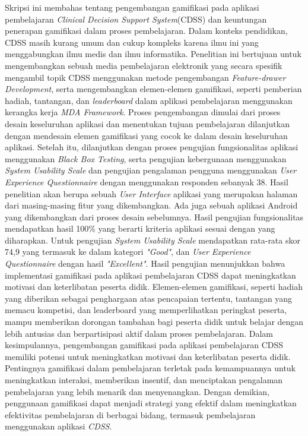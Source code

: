 Skripsi ini membahas tentang pengembangan gamifikasi pada aplikasi pembelajaran \textit{Clinical Decision Support System}(CDSS) dan keuntungan penerapan gamifikasi dalam proses pembelajaran. 
Dalam konteks pendidikan, CDSS masih kurang umum dan cukup kompleks karena ilmu ini yang menggabungkan ilmu medis dan ilmu informatika.
Penelitian ini bertujuan untuk mengembangkan sebuah media pembelajaran elektronik yang secara spesifik mengambil topik CDSS menggunakan metode pengembangan \textit{Feature-drawer Development},
serta mengembangkan elemen-elemen gamifikasi, seperti pemberian hadiah, tantangan, dan \textit{leaderboard} dalam aplikasi pembelajaran menggunakan kerangka kerja \textit{MDA Framework}. 
Proses pengembangan dimulai dari proses desain keseluruhan aplikasi dan menentukan tujuan pembelajaran dilanjutkan dengan mendesain elemen gamifikasi yang cocok ke dalam desain keseluruhan aplikasi.
Setelah itu, dilanjutkan dengan proses pengujian fungsionalitas aplikasi menggunakan \textit{Black Box Testing}, serta pengujian kebergunaan menggunakan \textit{System Usability Scale} dan pengujian pengalaman pengguna menggunakan \textit{User Experience Questionnaire} dengan menggunakan responden sebanyak 38.
Hasil penelitian akan berupa sebuah \textit{User Interface} aplikasi yang merupakan halaman dari masing-masing fitur yang dikembangkan. Ada juga sebuah aplikasi Android yang dikembangkan dari proses desain sebelumnya.
Hasil pengujian fungsionalitas mendapatkan hasil 100\% yang berarti kriteria aplikasi sesuai dengan yang diharapkan. 
Untuk pengujian \textit{System Usability Scale} mendapatkan rata-rata skor 74,9 yang termasuk ke dalam kategori \textit{"Good"}, dan \textit{User Experience Questionnaire} dengan hasil \textit{"Excellent"}.
Hasil pengujian menunjukkan bahwa implementasi gamifikasi pada aplikasi pembelajaran CDSS dapat meningkatkan motivasi dan keterlibatan peserta didik. Elemen-elemen gamifikasi, seperti hadiah yang diberikan sebagai penghargaan atas pencapaian tertentu, tantangan yang memacu kompetisi, dan leaderboard yang memperlihatkan peringkat peserta, mampu memberikan dorongan tambahan bagi peserta didik untuk belajar dengan lebih antusias dan berpartisipasi aktif dalam proses pembelajaran.
Dalam kesimpulannya, pengembangan gamifikasi pada aplikasi pembelajaran CDSS memiliki potensi untuk meningkatkan motivasi dan keterlibatan peserta didik. Pentingnya gamifikasi dalam pembelajaran terletak pada kemampuannya untuk meningkatkan interaksi, memberikan insentif, dan menciptakan pengalaman pembelajaran yang lebih menarik dan menyenangkan. Dengan demikian, penggunaan gamifikasi dapat menjadi strategi yang efektif dalam meningkatkan efektivitas pembelajaran di berbagai bidang, termasuk pembelajaran menggunakan aplikasi \textit{CDSS}.

